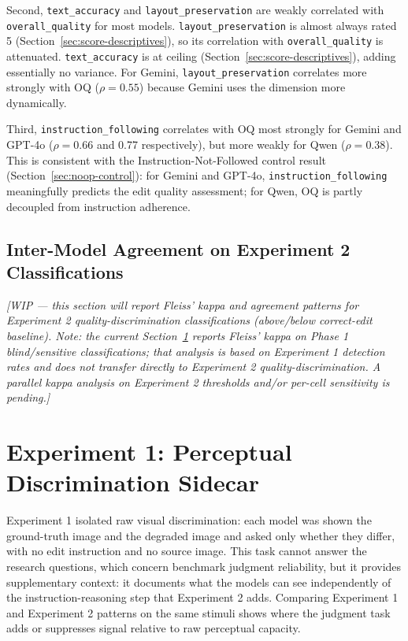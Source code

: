 Second, \texttt{text\_accuracy} and \texttt{layout\_preservation} are weakly correlated with \texttt{overall\_quality} for most models. \texttt{layout\_preservation} is almost always rated 5 (Section~\ref{sec:score-descriptives}), so its correlation with \texttt{overall\_quality} is attenuated. \texttt{text\_accuracy} is at ceiling (Section~\ref{sec:score-descriptives}), adding essentially no variance. For Gemini, \texttt{layout\_preservation} correlates more strongly with OQ ($\rho = 0.55$) because Gemini uses the dimension more dynamically.

Third, \texttt{instruction\_following} correlates with OQ most strongly for Gemini and GPT-4o ($\rho = 0.66$ and 0.77 respectively), but more weakly for Qwen ($\rho = 0.38$). This is consistent with the Instruction-Not-Followed control result (Section~\ref{sec:noop-control}): for Gemini and GPT-4o, \texttt{instruction\_following} meaningfully predicts the edit quality assessment; for Qwen, OQ is partly decoupled from instruction adherence.

\subsection{Inter-Model Agreement on Experiment 2 Classifications}

\textit{[WIP --- this section will report Fleiss' kappa and agreement patterns for Experiment 2 quality-discrimination classifications (above/below correct-edit baseline). Note: the current Section~\ref{sec:exp1-sidecar} reports Fleiss' kappa on Phase 1 blind/sensitive classifications; that analysis is based on Experiment 1 detection rates and does not transfer directly to Experiment 2 quality-discrimination. A parallel kappa analysis on Experiment 2 thresholds and/or per-cell sensitivity is pending.]}


\section{Experiment 1: Perceptual Discrimination Sidecar} \label{sec:exp1-sidecar}

Experiment 1 isolated raw visual discrimination: each model was shown the ground-truth image and the degraded image and asked only whether they differ, with no edit instruction and no source image. This task cannot answer the research questions, which concern benchmark judgment reliability, but it provides supplementary context: it documents what the models can see independently of the instruction-reasoning step that Experiment 2 adds. Comparing Experiment 1 and Experiment 2 patterns on the same stimuli shows where the judgment task adds or suppresses signal relative to raw perceptual capacity.

